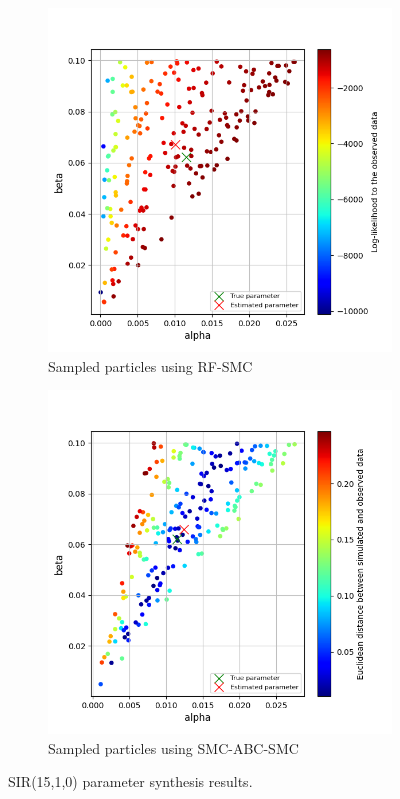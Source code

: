 \begin{figure}[H]
    \centering
    \begin{subfigure}{0.48\textwidth}
        \centering
        \includegraphics[width=\linewidth]{figures/sir1510_rfsmc.png}
        \caption{Sampled particles using RF-SMC}
    \end{subfigure}
    \hfill
    \begin{subfigure}{0.48\textwidth}
        \centering
        \includegraphics[width=\linewidth]{figures/sir1510_abcsmc.png}
        \caption{Sampled particles using SMC-ABC-SMC}
    \end{subfigure}
    \caption{SIR(15,1,0) parameter synthesis results.}
\end{figure}

